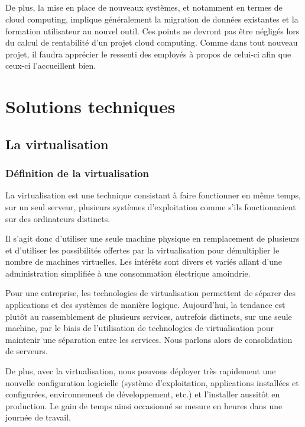 \documentclass[a4paper,12pt]{report}
\begin{document}
\begin{onehalfspace}
	\paragraph*{}
	De plus, la mise en place de nouveaux systèmes, et notamment en termes de cloud computing, implique généralement la migration de données existantes et la formation utilisateur au nouvel outil. Ces points ne devront pas être négligés lors du calcul de rentabilité d’un projet cloud computing. Comme dans tout nouveau projet, il faudra apprécier le ressenti des employés à propos de celui-ci afin que ceux-ci l’accueillent bien.

	\chapter{Solutions techniques}
	
	\section{La virtualisation}
	
	\subsection{Définition de la virtualisation}
	La virtualisation est une technique consistant à faire fonctionner en même temps, sur un seul serveur, plusieurs systèmes d'exploitation comme s'ils fonctionnaient sur des ordinateurs distincts.
	
	 Il s’agit donc d’utiliser une seule machine physique en remplacement de plusieurs et d’utiliser les possibilités offertes par la virtualisation pour démultiplier le nombre de machines virtuelles. Les intérêts sont divers et variés allant d’une administration simplifiée à une consommation électrique amoindrie.
	 
	Pour une entreprise, les technologies de virtualisation permettent de séparer des applications et des systèmes de manière logique. Aujourd'hui, la tendance est plutôt au rassemblement de plusieurs services, autrefois distincts, sur une seule machine, par le biais de l’utilisation de technologies de virtualisation pour maintenir une séparation entre les services. Nous parlons alors de consolidation de serveurs.
	
	De plus, avec la virtualisation, nous pouvons déployer très rapidement une nouvelle configuration logicielle (système d’exploitation, applications installées et configurées, environnement de développement, etc.) et l’installer aussitôt en production. Le gain de temps ainsi occasionné se mesure en heures dans une journée de travail. 
	

\end{onehalfspace}
\end{document}
